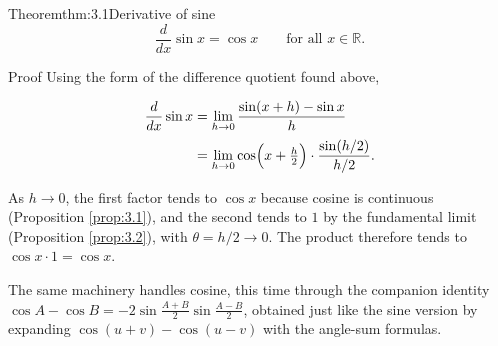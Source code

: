 \documentclass[a4paper,12pt,oneside]{memoir}
\begin{document}
\begin{envtheorem}{Theorem}{thm:3.1}{Derivative of sine}
\[ \frac{d}{dx}\sin x = \cos x \qquad \text{for all } x \in \mathbb{R}. \]
\end{envtheorem}
\begin{envproof}{Proof}{}{}
Using the form of the difference quotient found above,

\[ \begin{aligned}
        \frac{d}{dx}\sin x &= \lim_{h \to 0} \frac{\sin(x + h) - \sin x}{h} \\[2pt]
          &= \lim_{h \to 0} \cos\Bigl(x + \tfrac{h}{2}\Bigr) \cdot \frac{\sin(h/2)}{h/2}.
      \end{aligned} \]

As \(h \to 0\), the first factor tends to \(\cos x\) because cosine is continuous (Proposition \ref{prop:3.1}), and the second tends to \(1\) by the fundamental limit (Proposition \ref{prop:3.2}), with \(\theta = h/2 \to 0\). The product therefore tends to \(\cos x \cdot 1 = \cos x\).
\end{envproof}
The same machinery handles cosine, this time through the companion identity \(\cos A - \cos B = -2 \sin\frac{A + B}{2} \sin\frac{A - B}{2}\), obtained just like the sine version by expanding \(\cos(u + v) - \cos(u - v)\) with the angle-sum formulas.
\end{document}
